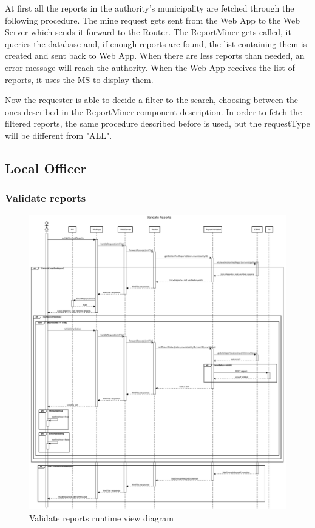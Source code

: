 						At first all the reports in the authority's municipality are fetched through the following procedure. The mine request gets sent from the Web App to the Web Server which sends it forward to the Router. The ReportMiner gets called, it queries the database and, if enough reports are found, the list containing them is created and sent back to Web App. When there are less reports than needed, an error message will reach the authority. When the Web App receives the list of reports, it uses the MS to display them. 
						
						Now the requester is able to decide a filter to the search, choosing between the ones described in the ReportMiner component description. In order to fetch the filtered reports, the same procedure described before is used, but the requestType will be different from "ALL".
			\clearpage
			\subsection{Local Officer}
				\subsubsection{Validate reports}
					\begin{figure}[!h]
						\centering
						\includegraphics[width=\textwidth]{images/DD2/RuntimeView/Authority/LO/ValidateReports.pdf}
						\caption{Validate reports runtime view diagram}
					\end{figure}

